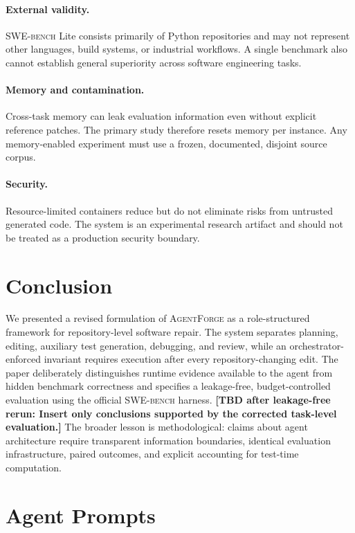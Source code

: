 \documentclass[journal]{IEEEtran}
\newcommand{\agentforge}{\textsc{AgentForge}}
\newcommand{\swebench}{\textsc{SWE-bench}}
\newcommand{\tbd}[1]{\textcolor{red!70!black}{\textbf{[TBD after leakage-free rerun: #1]}}}
\begin{document}
\paragraph{External validity.}
\swebench{} Lite consists primarily of Python repositories and may not represent other languages, build systems, or industrial workflows. A single benchmark also cannot establish general superiority across software engineering tasks.

\paragraph{Memory and contamination.}
Cross-task memory can leak evaluation information even without explicit reference patches. The primary study therefore resets memory per instance. Any memory-enabled experiment must use a frozen, documented, disjoint source corpus.

\paragraph{Security.}
Resource-limited containers reduce but do not eliminate risks from untrusted generated code. The system is an experimental research artifact and should not be treated as a production security boundary.

\section{Conclusion}
\label{sec:conclusion}

We presented a revised formulation of \agentforge{} as a role-structured framework for repository-level software repair. The system separates planning, editing, auxiliary test generation, debugging, and review, while an orchestrator-enforced invariant requires execution after every repository-changing edit. The paper deliberately distinguishes runtime evidence available to the agent from hidden benchmark correctness and specifies a leakage-free, budget-controlled evaluation using the official \swebench{} harness. \tbd{Insert only conclusions supported by the corrected task-level evaluation.} The broader lesson is methodological: claims about agent architecture require transparent information boundaries, identical evaluation infrastructure, paired outcomes, and explicit accounting for test-time computation.

\appendices

\section{Agent Prompts}
\label{app:prompts}
\end{document}

